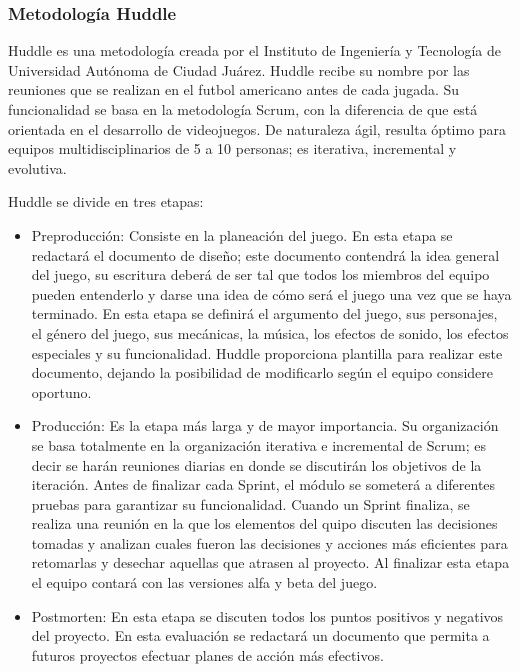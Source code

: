 \subsubsection{Metodología Huddle}
Huddle es una metodología creada por el Instituto de Ingeniería y Tecnología de Universidad Autónoma de Ciudad Juárez. Huddle recibe su nombre por las reuniones que se realizan en el futbol americano antes de cada jugada. Su funcionalidad se basa en la metodología Scrum, con la diferencia de que está orientada en el desarrollo de videojuegos.  De naturaleza ágil, resulta óptimo para equipos multidisciplinarios de 5 a 10 personas; es iterativa, incremental y evolutiva.
\\
\par
Huddle se divide en tres etapas: 
	\begin{itemize}
		\item Preproducción: Consiste en la planeación del juego. En esta etapa se redactará el documento de diseño; este documento contendrá la idea general del juego, su escritura deberá de ser tal que todos los miembros del equipo pueden entenderlo y darse una idea de cómo será el juego una vez que se haya terminado. En esta etapa se definirá el argumento del juego, sus personajes, el género del juego, sus mecánicas, la música, los efectos de sonido, los efectos especiales y su funcionalidad. Huddle proporciona plantilla para realizar este documento, dejando la posibilidad de modificarlo según el equipo considere oportuno.
		\item Producción: Es la etapa más larga y de mayor importancia. Su organización se basa totalmente en la organización iterativa e incremental de Scrum; es decir se harán reuniones diarias en donde se discutirán los objetivos de la iteración. Antes de finalizar cada Sprint, el módulo se someterá a diferentes pruebas para garantizar su funcionalidad. Cuando un Sprint finaliza, se realiza una reunión en la que los elementos del quipo discuten las decisiones tomadas y analizan cuales fueron las decisiones y acciones más eficientes para retomarlas y desechar aquellas que atrasen al proyecto. Al finalizar esta etapa el equipo contará con las versiones alfa y beta del juego. 
		\item Postmorten: En esta etapa se discuten todos los puntos positivos y negativos del proyecto. En esta evaluación se redactará un documento que permita a futuros proyectos efectuar planes de acción más efectivos.
	\end{itemize}
